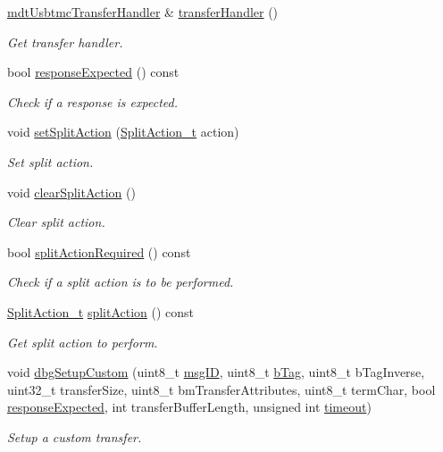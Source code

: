 \begin{DoxyCompactItemize}
\hyperlink{classmdt_usbtmc_transfer_handler}{mdt\-Usbtmc\-Transfer\-Handler} \& \hyperlink{classmdt_usbtmc_bulk_transfer_a10dbec33fd2e7844e35841e4d0a1d7a9}{transfer\-Handler} ()
\begin{DoxyCompactList}\small\item\em Get transfer handler. \end{DoxyCompactList}\item 
bool \hyperlink{classmdt_usbtmc_bulk_transfer_afda5d4a8eef1381cc7ebc121b95a112e}{response\-Expected} () const 
\begin{DoxyCompactList}\small\item\em Check if a response is expected. \end{DoxyCompactList}\item 
void \hyperlink{classmdt_usbtmc_bulk_transfer_a313d55e028ff3f6c90d511294a90fab6}{set\-Split\-Action} (\hyperlink{classmdt_usbtmc_bulk_transfer_a81f2309d821053cd7c8f6e32aff93b7c}{Split\-Action\-\_\-t} action)
\begin{DoxyCompactList}\small\item\em Set split action. \end{DoxyCompactList}\item 
void \hyperlink{classmdt_usbtmc_bulk_transfer_a574fbd5ed5c2850e86ad36e8964c7e7d}{clear\-Split\-Action} ()
\begin{DoxyCompactList}\small\item\em Clear split action. \end{DoxyCompactList}\item 
bool \hyperlink{classmdt_usbtmc_bulk_transfer_ac11193559ba081b99018dae36915ac00}{split\-Action\-Required} () const 
\begin{DoxyCompactList}\small\item\em Check if a split action is to be performed. \end{DoxyCompactList}\item 
\hyperlink{classmdt_usbtmc_bulk_transfer_a81f2309d821053cd7c8f6e32aff93b7c}{Split\-Action\-\_\-t} \hyperlink{classmdt_usbtmc_bulk_transfer_a62a98f509c9b267cfe6ceb163d285379}{split\-Action} () const 
\begin{DoxyCompactList}\small\item\em Get split action to perform. \end{DoxyCompactList}\item 
void \hyperlink{classmdt_usbtmc_bulk_transfer_ab3d5c309fd992fc8c2690d6faa9b42f4}{dbg\-Setup\-Custom} (uint8\-\_\-t \hyperlink{classmdt_usbtmc_bulk_transfer_a1ee96cb0af0b5e1322ceb6ed65082345}{msg\-I\-D}, uint8\-\_\-t \hyperlink{classmdt_usbtmc_bulk_transfer_a7975795ea5299a1a82c1ec303be24e2e}{b\-Tag}, uint8\-\_\-t b\-Tag\-Inverse, uint32\-\_\-t transfer\-Size, uint8\-\_\-t bm\-Transfer\-Attributes, uint8\-\_\-t term\-Char, bool \hyperlink{classmdt_usbtmc_bulk_transfer_afda5d4a8eef1381cc7ebc121b95a112e}{response\-Expected}, int transfer\-Buffer\-Length, unsigned int \hyperlink{classmdt_usb_transfer_a3262511f6062348132e7ee689c24226c}{timeout})
\begin{DoxyCompactList}\small\item\em Setup a custom transfer. \end{DoxyCompactList}\end{DoxyCompactItemize}
